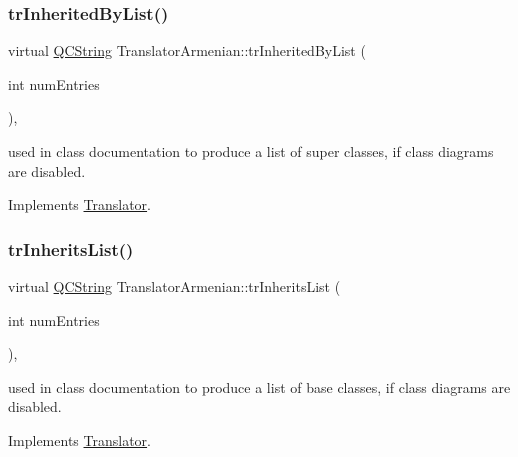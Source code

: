 \mbox{\label{class_translator_armenian_a69562e6700e389e7ac477dafb4b31097}} 
\subsubsection{\texorpdfstring{trInheritedByList()}{trInheritedByList()}}
{\footnotesize\ttfamily virtual \mbox{\hyperlink{class_q_c_string}{Q\+C\+String}} Translator\+Armenian\+::tr\+Inherited\+By\+List (\begin{DoxyParamCaption}\item[{int}]{num\+Entries }\end{DoxyParamCaption})\hspace{0.3cm}{\ttfamily [inline]}, {\ttfamily [virtual]}}

used in class documentation to produce a list of super classes, if class diagrams are disabled. 

Implements \mbox{\hyperlink{class_translator}{Translator}}.

\mbox{\label{class_translator_armenian_a764c7111f090d57e7e62f74df640d7d1}} 
\subsubsection{\texorpdfstring{trInheritsList()}{trInheritsList()}}
{\footnotesize\ttfamily virtual \mbox{\hyperlink{class_q_c_string}{Q\+C\+String}} Translator\+Armenian\+::tr\+Inherits\+List (\begin{DoxyParamCaption}\item[{int}]{num\+Entries }\end{DoxyParamCaption})\hspace{0.3cm}{\ttfamily [inline]}, {\ttfamily [virtual]}}

used in class documentation to produce a list of base classes, if class diagrams are disabled. 

Implements \mbox{\hyperlink{class_translator}{Translator}}.

\mbox{\label{class_translator_armenian_a2d6df2663238c6de276172e0cf526c80}} 

